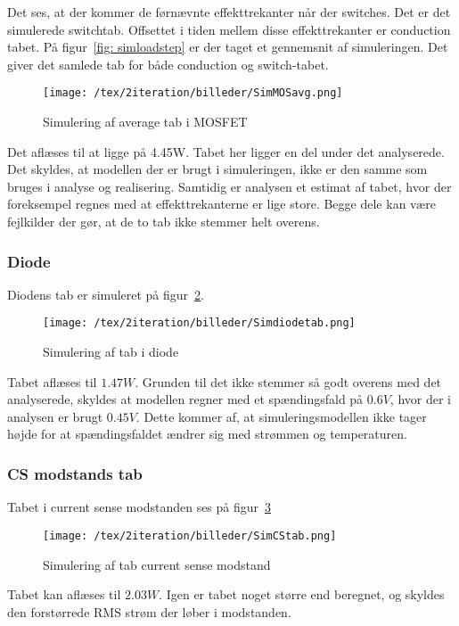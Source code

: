 Det ses, at der kommer de førnævnte effekttrekanter når der switches. Det er det simulerede switchtab. Offsettet i tiden mellem disse effekttrekanter er conduction tabet.
På figur~\ref{fig: simloadstep} er der taget et gennemsnit af simuleringen. Det giver det samlede tab for både conduction og switch-tabet. 
\begin{figure}[H]
	\center
	\texttt{[image: /tex/2iteration/billeder/SimMOSavg.png]}
	\caption{Simulering af average tab i MOSFET}
	\label{fig: SimMOSavg}
\end{figure} 

Det aflæses til at ligge på 4.45W. Tabet her ligger en del  under det analyserede. Det skyldes, at modellen der er brugt i simuleringen, ikke er den samme som bruges i analyse og realisering. Samtidig er analysen et estimat af tabet, hvor der foreksempel regnes med at effekttrekanterne er lige store. Begge dele kan være fejlkilder der gør, at de to tab ikke stemmer helt overens.  

\subsubsection{Diode}
\noindent Diodens tab er simuleret på figur~\ref{fig: simdiodetab}. 
\begin{figure}[H]
	\center
	\texttt{[image: /tex/2iteration/billeder/Simdiodetab.png]}
	\caption{Simulering af tab i diode}
	\label{fig: simdiodetab}
\end{figure}
Tabet aflæses til $1.47W$. Grunden til det ikke stemmer så godt overens med det analyserede, skyldes at modellen regner med et spændingsfald på $0.6V$, hvor der i analysen er brugt $0.45V$. Dette kommer af, at simuleringsmodellen ikke tager højde for at spændingsfaldet ændrer sig med strømmen og temperaturen. 

\subsubsection{CS modstands tab}
\noindent Tabet i current sense modstanden ses på figur~\ref{fig: simdCStab}
\begin{figure}[H]
	\center
	\texttt{[image: /tex/2iteration/billeder/SimCStab.png]}
	\caption{Simulering af tab current sense modstand}
	\label{fig: simdCStab}
\end{figure}
Tabet kan aflæses til $2.03W$. Igen er tabet noget større end beregnet, og skyldes den forstørrede RMS strøm der løber i modstanden.

